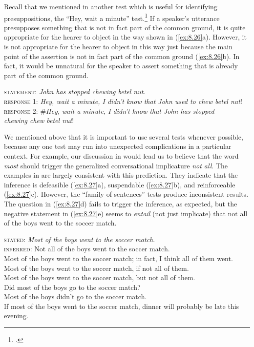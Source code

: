 Recall that we mentioned in  another test which is useful for identifying presuppositions, the “Hey, wait a minute” test.\footnote{.} If a speaker’s utterance presupposes something that is not in fact part of the common ground, it is quite appropriate for the hearer to object in the way shown in (\ref{ex:8.26}a). However, it is not appropriate for the hearer to object in this way just because the main point of the assertion is not in fact part of the common ground (\ref{ex:8.26}b). In fact, it would be unnatural for the speaker to assert something that is already part of the common ground.

\ea \label{ex:8.26}
\textsc{statement}: \textit{John has stopped chewing betel nut}.\\
\ea \textsc{response 1}: \textit{Hey, wait a minute, I didn’t know that John used to chew betel nut}!\\
\ex \textsc{response 2}: \#\textit{Hey, wait a minute, I didn’t know that John has stopped\\
  chewing chew betel nut}!
   \z
   \z

We mentioned above that it is important to use several tests whenever possible, because any one test may run into unexpected complications in a particular context. For example, our discussion in  would lead us to believe that the word \textit{most} should trigger the generalized conversational implicature \textit{not all}. The examples in  are largely consistent with this prediction. They indicate that the inference is defeasible (\ref{ex:8.27}a), suspendable (\ref{ex:8.27}b), and reinforceable (\ref{ex:8.27}c). However, the “family of sentences” tests produce inconsistent results. The question in (\ref{ex:8.27}d) fails to trigger the inference, as expected, but the negative statement in (\ref{ex:8.27}e) seems to \textit{entail} (not just implicate) that not all of the boys went to the soccer match.

\ea \label{ex:8.27}
\textsc{stated}: \textit{Most of the boys went to the soccer match}.\\
\textsc{inferred}: Not all of the boys went to the soccer match.\\
\ea Most of the boys went to the soccer match; in fact, I think all of them went.\\
\ex Most of the boys went to the soccer match, if not all of them.\\
\ex Most of the boys went to the soccer match, but not all of them.\\
\ex Did most of the boys go to the soccer match?\\
\ex Most of the boys didn’t go to the soccer match.\\
\ex If most of the boys went to the soccer match, dinner will probably be late this evening.
                       \z
\z

